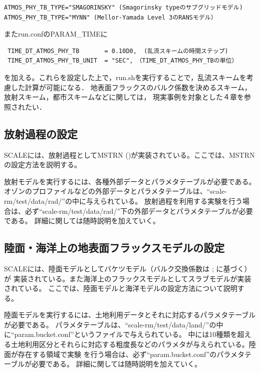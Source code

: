 \begin{verbatim}
ATMOS_PHY_TB_TYPE="SMAGORINSKY" (Smagorinsky typeのサブグリッドモデル)
ATMOS_PHY_TB_TYPE="MYNN" (Mellor-Yamada Level 3のRANSモデル）
\end{verbatim}

またrun.confのPARAM\_TIMEに

\begin{verbatim}
 TIME_DT_ATMOS_PHY_TB       = 0.10D0,  (乱流スキームの時間ステップ)
 TIME_DT_ATMOS_PHY_TB_UNIT  = "SEC",　（TIME_DT_ATMOS_PHY_TBの単位）
\end{verbatim}

を加える。これらを設定した上で，run.shを実行することで，乱流スキームを考慮した計算が可能になる．
地表面フラックスのバルク係数を決めるスキーム，放射スキーム，都市スキームなどに関しては，
現実事例を対象とした４章を参照されたい．


\subsection{放射過程の設定} \label{sec:adv_radiation}
SCALEには、放射過程としてMSTRN (\cite{sekiguchi_2008})が実装されている。ここでは、MSTRNの設定方法を説明する。

放射モデルを実行するには、各種外部データとパラメタテーブルが必要である。
オゾンのプロファイルなどの外部データとパラメタテーブルは、``scale-rm/test/data/rad/''の中に与えられている。
放射過程を利用する実験を行う場合は、必ず``scale-rm/test/data/rad/''下の外部データとパラメタテーブルが必要である。
詳細に関しては随時説明を加えていく。


\subsection{陸面・海洋上の地表面フラックスモデルの設定} \label{sec:adv_landocean}
SCALEには、陸面モデルとしてバケツモデル（バルク交換係数は \cite{beljaars_1991}; \cite{wilson_2001}に基づく）が
実装されている。また海洋上のフラックスモデルとしてスラブモデルが実装されている。
ここでは、陸面モデルと海洋モデルの設定方法について説明する。

陸面モデルを実行するには、土地利用データとそれに対応するパラメタテーブルが必要である。
パラメタテーブルは、``scale-rm/test/data/land/''の中に``param.bucket.conf''というファイルで与えられている。
中には10種類を超える土地利用区分とそれらに対応する粗度長などのパラメタが与えられている。陸面が存在する領域で実験
を行う場合は、必ず``param.bucket.conf''のパラメタテーブルが必要である。
詳細に関しては随時説明を加えていく。


